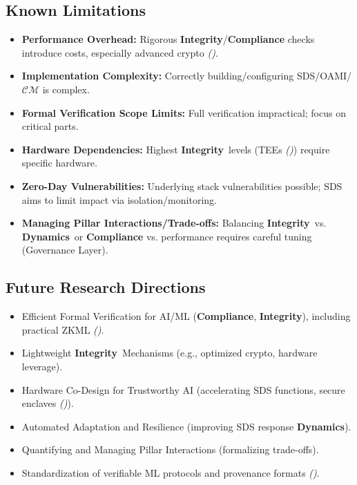 \documentclass[12pt,a4paper]{report}
\renewcommand{\citep}[1]{\textit{\scriptsize{(\cite{#1})}}}
\newcommand{\Integrity}{\textbf{Integrity}}
\newcommand{\Dynamics}{\textbf{Dynamics}}
\begin{document}
	\subsection{Known Limitations} %
	\label{sec:4-7-2} %
	
	\begin{itemize}[noitemsep]
		\item \textbf{Performance Overhead:} Rigorous \Integrity/\textbf{Compliance} checks introduce costs, especially advanced crypto \citep{Peng2025ZKMLSurvey}.
		\item \textbf{Implementation Complexity:} Correctly building/configuring SDS/OAMI/$\mathcal{CM}$ is complex.
		\item \textbf{Formal Verification Scope Limits:} Full verification impractical; focus on critical parts.
		\item \textbf{Hardware Dependencies:} Highest \Integrity\ levels (TEEs \citep{Citadel_PlusPlus_2025}) require specific hardware.
		\item \textbf{Zero-Day Vulnerabilities:} Underlying stack vulnerabilities possible; SDS aims to limit impact via isolation/monitoring.
		\item \textbf{Managing Pillar Interactions/Trade-offs:} Balancing \Integrity\ vs. \Dynamics\ or \textbf{Compliance} vs. performance requires careful tuning (Governance Layer).
	\end{itemize}
	
	\subsection{Future Research Directions} %
	\label{sec:4-7-3} %
	
	\begin{itemize}[noitemsep]
		\item Efficient Formal Verification for AI/ML (\textbf{Compliance}, \Integrity), including practical ZKML \citep{Peng2025ZKMLSurvey}.
		\item Lightweight \Integrity\ Mechanisms (e.g., optimized crypto, hardware leverage).
		\item Hardware Co-Design for Trustworthy AI (accelerating SDS functions, secure enclaves \citep{Citadel_PlusPlus_2025}).
		\item Automated Adaptation and Resilience (improving SDS response \Dynamics).
		\item Quantifying and Managing Pillar Interactions (formalizing trade-offs).
		\item Standardization of verifiable ML protocols and provenance formats \citep{ProML_Provenance_2022}.
	\end{itemize}
	
\end{document}
